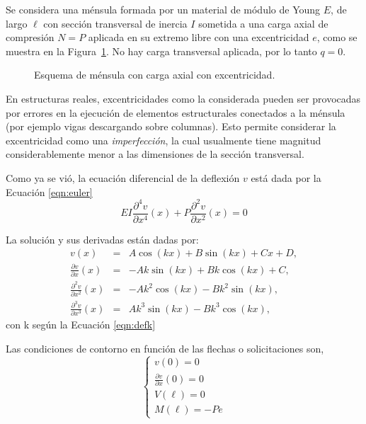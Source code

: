 Se considera una ménsula formada por un material de módulo de Young $E$, de largo $\ell$ con sección transversal de inercia $I$ sometida a una carga axial de compresión $N=P$ aplicada en su extremo libre con una excentricidad $e$, como se muestra en la Figura~\ref{fig:esqpand}. %
%
No hay carga transversal aplicada, por lo tanto $q=0$. %

\begin{figure}[htb]
\centering
\def\svgwidth{0.5\textwidth}

\caption{Esquema de ménsula con carga axial con excentricidad.}
\label{fig:esqpand}
\end{figure}

En estructuras reales, excentricidades como la considerada pueden ser provocadas por errores en la ejecución de elementos estructurales conectados a la ménsula (por ejemplo vigas descargando sobre columnas). %
%
Esto permite considerar la excentricidad como una \textit{imperfección}, la cual usualmente tiene magnitud considerablemente menor a las dimensiones de la sección transversal. %

Como ya se vió, la ecuación diferencial de la deflexión $v$ está dada por la Ecuación \eqref{eqn:euler}
$$
  E I \frac{\partial^4 v}{\partial x^4}(x)
+   P \frac{\partial^2 v}{\partial x^2}(x)
=   0
$$

La solución y sus derivadas están dadas por:
\begin{eqnarray}
v(x) &=& A \cos(k x ) + B \sin(kx) + C x + D, \\
\frac{\partial   v}{\partial x  } (x) &=& -A k \sin(k x ) + B k \cos(kx) + C , \\
\frac{\partial^2 v}{\partial x^2} (x) &=& - A k^2 \cos(k x ) - B k^2 \sin(kx),  \\
\frac{\partial^3 v}{\partial x^3} (x) &=& A k^3 \sin(k x ) - B k^3 \cos(kx), 
\end{eqnarray}
con k según la Ecuación \eqref{eqn:defk}

Las condiciones de contorno en función de las flechas o solicitaciones son,
\begin{equation}
\left\{
\begin{array}{l}
v(0)=0 \\[.5em]
\displaystyle \frac{\partial v}{\partial x}(0)=0\\[1em]
V(\ell)=0\\[.5em]
M(\ell)=-P e
\end{array}
\right.
\end{equation}

